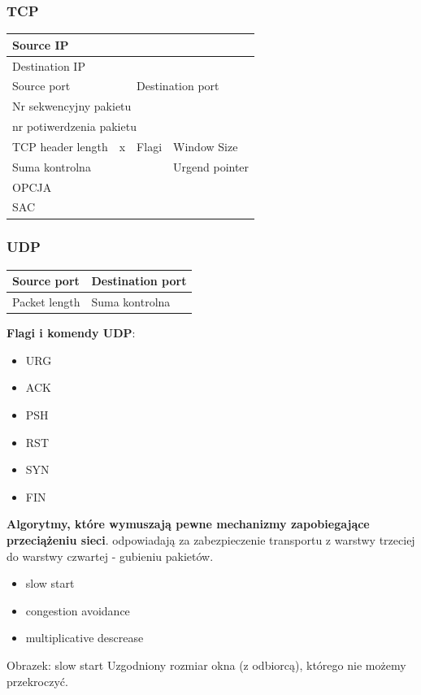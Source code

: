 \documentclass[a4paper,twoside]{article}
\begin{document}
\subsubsection{TCP}
\begin{table}[h]
	\begin{tabular}{|c|c|c|c|c|}
		\hline
		\multicolumn{5}{|l|}{Source IP}                 \\ \hline
		\multicolumn{5}{|l|}{Destination IP}                 \\ \hline
		\multicolumn{2}{|l|}{Source port} & \multicolumn{3}{l|}{Destination port}                \\ \hline
		\multicolumn{5}{|l|}{Nr sekwencyjny pakietu}                                             \\ \hline
		\multicolumn{5}{|l|}{nr potiwerdzenia pakietu}                                           \\ \hline
		TCP header length       & x       & Flagi          & \multicolumn{2}{l|}{Window Size}    \\ \hline
		\multicolumn{3}{|l|}{Suma kontrolna}               & \multicolumn{2}{l|}{Urgend pointer} \\ \hline
		\multicolumn{5}{|l|}{OPCJA}  \\ \hline
		\multicolumn{5}{|l|}{SAC}  \\ \hline
	\end{tabular}
\end{table}

\subsubsection{UDP}
\begin{table}[h]
	\begin{tabular}{|l|l|l|l|l|}
		\hline
		\multicolumn{2}{|l|}{Source port}   & \multicolumn{3}{l|}{Destination port} \\ \hline
		\multicolumn{2}{|l|}{Packet length} & \multicolumn{3}{l|}{Suma kontrolna}   \\ \hline
	\end{tabular}
\end{table}

\textbf{Flagi i komendy UDP}:
\begin{itemize}
	\item URG
	\item ACK
	\item PSH
	\item RST
	\item SYN
	\item FIN
\end{itemize}

\textbf{Algorytmy, które wymuszają pewne mechanizmy zapobiegające przeciążeniu sieci}. odpowiadają za zabezpieczenie transportu z warstwy trzeciej do warstwy czwartej - gubieniu pakietów.
\begin{itemize}
	\item slow start
	\item congestion avoidance
	\item multiplicative descrease
\end{itemize}

Obrazek: slow start
Uzgodniony rozmiar okna (z odbiorcą), którego nie możemy przekroczyć.
\end{document}
